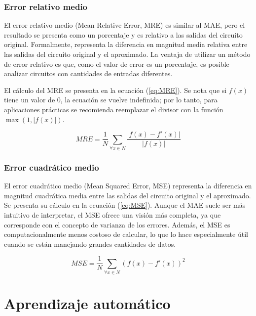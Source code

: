 \subsubsection{Error relativo medio}

El error relativo medio (Mean Relative Error, MRE) es similar al MAE, pero el
resultado se presenta como un porcentaje y es relativo a las salidas del
circuito original. Formalmente, representa la diferencia en magnitud media
relativa entre las salidas del circuito original y el aproximado. La ventaja de
utilizar un método de error relativo es que, como el valor de error es un
porcentaje, es posible analizar circuitos con cantidades de entradas
diferentes.

El cálculo del MRE se presenta en la ecuación (\ref{eq:MRE}). Se nota que si
$f(x)$ tiene un valor de $0$, la ecuación se vuelve indefinida; por lo tanto,
para aplicaciones prácticas se recomienda reemplazar el divisor con la función
$\max \left( 1, \left| f(x) \right| \right)$.

\begin{equation} \label{eq:MRE}
  MRE = \frac{1}{N} \sum_{\forall x \in N} \frac{ \left| f(x) - f'(x) \right| }{ \left| f(x) \right| }
\end{equation}

\subsubsection{Error cuadrático medio}

El error cuadrático medio (Mean Squared Error, MSE) representa la diferencia en
magnitud cuadrática media entre las salidas del circuito original y el
aproximado. Se presenta su cálculo en la ecuación (\ref{eq:MSE}). Aunque el MAE
suele ser más intuitivo de interpretar, el MSE ofrece una visión más completa,
ya que corresponde con el concepto de varianza de los errores. Además, el MSE
es computacionalmente menos costoso de calcular, lo que lo hace especialmente
útil cuando se están manejando grandes cantidades de datos.

\begin{equation} \label{eq:MSE}
  MSE = \frac{1}{N} \sum_{\forall x \in N} \left( f(x) - f'(x) \right)^2
\end{equation}

\section{Aprendizaje automático}

